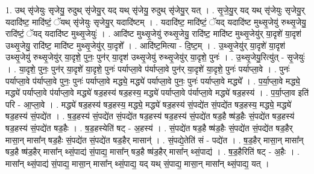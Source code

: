 \documentclass[17pt]{extarticle}
\begin{document}
1. उथ् सृ॑जेयुः सृजेयु॒ रुदुथ् सृ॑जेयु॒र् यद् यथ् सृ॑जेयु॒ रुदुथ् सृ॑जेयु॒र् यत् । . सृ॒जे॒यु॒र् यद् यथ् सृ॑जेयुः सृजेयु॒र् यदादि॑ष्ट॒ मादि॑ष्टं॒ ॅयथ् सृ॑जेयुः सृजेयु॒र् यदादि॑ष्टम् । . यदादि॑ष्ट॒ मादि॑ष्टं॒ ॅयद् यदादि॑ष्ट मुथ्सृ॒जेयु॑ रुथ्सृ॒जेयु॒ रादि॑ष्टं॒ ॅयद् यदादि॑ष्ट मुथ्सृ॒जेयुः॑ । . आदि॑ष्ट मुथ्सृ॒जेयु॑ रुथ्सृ॒जेयु॒ रादि॑ष्ट॒ मादि॑ष्ट मुथ्सृ॒जेयु॑र् या॒दृशे॑ या॒दृश॑ उथ्सृ॒जेयु॒ रादि॑ष्ट॒ मादि॑ष्ट मुथ्सृ॒जेयु॑र् या॒दृशे᳚ । . आदि॑ष्ट॒मित्या - दि॒ष्ट॒म् । . उ॒थ्सृ॒जेयु॑र् या॒दृशे॑ या॒दृश॑ उथ्सृ॒जेयु॑ रुथ्सृ॒जेयु॑र् या॒दृशे॒ पुनः॒ पुन॑र् या॒दृश॑ उथ्सृ॒जेयु॑ रुथ्सृ॒जेयु॑र् या॒दृशे॒ पुनः॑ । . उ॒थ्सृ॒जेयु॒रित्यु॑त् - सृ॒जेयुः॑ । . या॒दृशे॒ पुनः॒ पुन॑र् या॒दृशे॑ या॒दृशे॒ पुनः॑ पर्याप्ला॒वे प॑र्याप्ला॒वे पुन॑र् या॒दृशे॑ या॒दृशे॒ पुनः॑ पर्याप्ला॒वे । . पुनः॑ पर्याप्ला॒वे प॑र्याप्ला॒वे पुनः॒ पुनः॑ पर्याप्ला॒वे मद्ध्ये॒ मद्ध्ये॑ पर्याप्ला॒वे पुनः॒ पुनः॑ पर्याप्ला॒वे मद्ध्ये᳚ । . प॒र्या॒प्ला॒वे मद्ध्ये॒ मद्ध्ये॑ पर्याप्ला॒वे प॑र्याप्ला॒वे मद्ध्ये॑ षड॒हस्य॑ षड॒हस्य॒ मद्ध्ये॑ पर्याप्ला॒वे प॑र्याप्ला॒वे मद्ध्ये॑ षड॒हस्य॑ । . प॒र्या॒प्ला॒व इति॑ परि - आ॒प्ला॒वे । . मद्ध्ये॑ षड॒हस्य॑ षड॒हस्य॒ मद्ध्ये॒ मद्ध्ये॑ षड॒हस्य॑ सं॒पद्ये॑त सं॒पद्ये॑त षड॒हस्य॒ मद्ध्ये॒ मद्ध्ये॑ षड॒हस्य॑ सं॒पद्ये॑त । . ष॒ड॒हस्य॑ सं॒पद्ये॑त सं॒पद्ये॑त षड॒हस्य॑ षड॒हस्य॑ सं॒पद्ये॑त षड॒है ष्ष॑ड॒हैः सं॒पद्ये॑त षड॒हस्य॑ षड॒हस्य॑ सं॒पद्ये॑त षड॒हैः । . ष॒ड॒हस्येति॑ षट् - अ॒हस्य॑ । . सं॒पद्ये॑त षड॒है ष्ष॑ड॒हैः सं॒पद्ये॑त सं॒पद्ये॑त षड॒हैर् मासा॒न् मासा᳚न् षड॒हैः सं॒पद्ये॑त सं॒पद्ये॑त षड॒हैर् मासान्॑ । . सं॒पद्ये॒तेति॑ सं - पद्ये॑त । . ष॒ड॒हैर् मासा॒न् मासा᳚न् षड॒है ष्ष॑ड॒हैर् मासा᳚न् थ्सं॒पाद्य॑ सं॒पाद्य॒ मासा᳚न् षड॒है ष्ष॑ड॒हैर् मासा᳚न् थ्सं॒पाद्य॑ । . ष॒ड॒हैरिति॑ षट् - अ॒हैः । . मासा᳚न् थ्सं॒पाद्य॑ सं॒पाद्य॒ मासा॒न् मासा᳚न् थ्सं॒पाद्य॒ यद् यथ् सं॒पाद्य॒ मासा॒न् मासा᳚न् थ्सं॒पाद्य॒ यत् । \newline
\end{document}
